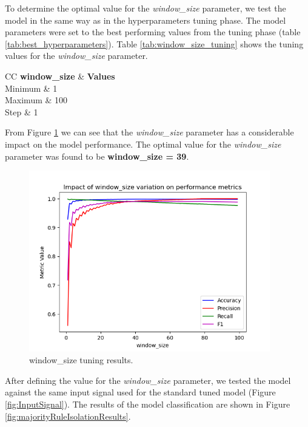 \documentclass[futureinternet,article,submit,pdftex,moreauthors]{Definitions/mdpi}
\begin{document}
To determine the optimal value for the \textit{window\_size} parameter, we test the model in the same way as in the hyperparameters tuning phase. The model parameters were set to the best performing values from the tuning phase (table \ref{tab:best_hyperparameters}). Table \ref{tab:window_size_tuning} shows the tuning values for the \textit{window\_size} parameter.

\begin{table}[H]
	\centering
	\caption{window\_size tuning values.}\label{tab:window_size_tuning}
	\begin{tabularx}{\textwidth}{CC}
	\toprule
	\textbf{window\_size} & \textbf{Values} \\
	\midrule
	Minimum & 1 \\
	Maximum & 100 \\
	Step & 1 \\
	\bottomrule
\end{tabularx}
\end{table}

From Figure \ref{fig:window_size_tuning} we can see that the \textit{window\_size} parameter has a considerable impact on the model performance. The optimal value for the \textit{window\_size} parameter was found to be \textbf{window\_size = 39}.

\begin{figure}[H]
	\includegraphics[width=10.5cm]{img/WindowSizeTuning.png}
	\caption{window\_size tuning results.}\label{fig:window_size_tuning}
\end{figure}

After defining the value for the \textit{window\_size} parameter, we tested the model against the same input signal used for the standard tuned model (Figure \ref{fig:InputSignal}). The results of the model classification are shown in Figure \ref{fig:majorityRuleIsolationResults}. 
\end{document}
